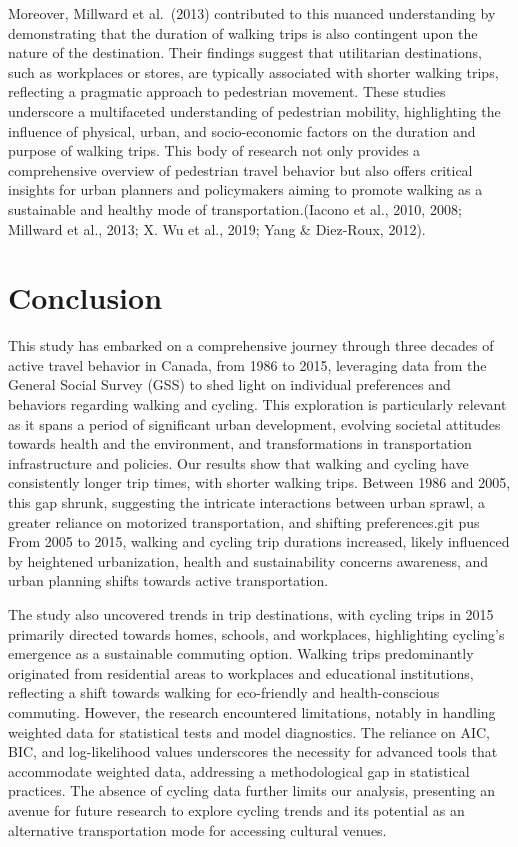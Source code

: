 \documentclass[
11pt, %
oneside, %
english, %
singlespacing, %
]{macthesis} %
\begin{document}
Moreover, Millward et al.~(2013) contributed to this nuanced understanding by demonstrating that the duration of walking trips is also contingent upon the nature of the destination. Their findings suggest that utilitarian destinations, such as workplaces or stores, are typically associated with shorter walking trips, reflecting a pragmatic approach to pedestrian movement.
These studies underscore a multifaceted understanding of pedestrian mobility, highlighting the influence of physical, urban, and socio-economic factors on the duration and purpose of walking trips. This body of research not only provides a comprehensive overview of pedestrian travel behavior but also offers critical insights for urban planners and policymakers aiming to promote walking as a sustainable and healthy mode of transportation.(Iacono et al., 2010, 2008; Millward et al., 2013; X. Wu et al., 2019; Yang \& Diez-Roux, 2012).

\hypertarget{conclusion}{%
\chapter*{Conclusion}\label{conclusion}}

This study has embarked on a comprehensive journey through three decades of active travel behavior in Canada, from 1986 to 2015, leveraging data from the General Social Survey (GSS) to shed light on individual preferences and behaviors regarding walking and cycling. This exploration is particularly relevant as it spans a period of significant urban development, evolving societal attitudes towards health and the environment, and transformations in transportation infrastructure and policies.
Our results show that walking and cycling have consistently longer trip times, with shorter walking trips. Between 1986 and 2005, this gap shrunk, suggesting the intricate interactions between urban sprawl, a greater reliance on motorized transportation, and shifting preferences.git pus From 2005 to 2015, walking and cycling trip durations increased, likely influenced by heightened urbanization, health and sustainability concerns awareness, and urban planning shifts towards active transportation.

The study also uncovered trends in trip destinations, with cycling trips in 2015 primarily directed towards homes, schools, and workplaces, highlighting cycling's emergence as a sustainable commuting option. Walking trips predominantly originated from residential areas to workplaces and educational institutions, reflecting a shift towards walking for eco-friendly and health-conscious commuting.
However, the research encountered limitations, notably in handling weighted data for statistical tests and model diagnostics. The reliance on AIC, BIC, and log-likelihood values underscores the necessity for advanced tools that accommodate weighted data, addressing a methodological gap in statistical practices. The absence of cycling data further limits our analysis, presenting an avenue for future research to explore cycling trends and its potential as an alternative transportation mode for accessing cultural venues.
\end{document}
